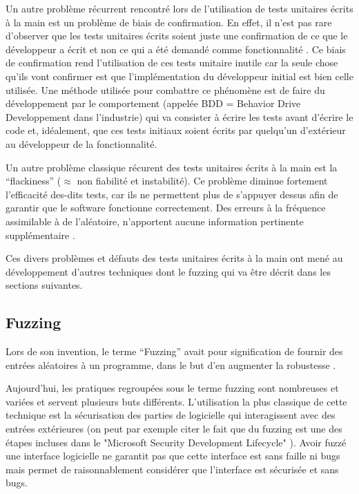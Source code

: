 \documentclass[a4paper]{report}
\begin{document}
Un autre problème récurrent rencontré lors de l'utilisation de tests unitaires écrits à la main est un problème de biais de confirmation.
En effet, il n'est pas rare d'observer que les tests unitaires écrits soient juste une confirmation de ce que le développeur a écrit et non ce qui a été demandé comme fonctionnalité \cite{Calikli2014}.
Ce biais de confirmation rend l'utilisation de ces tests unitaire inutile car la seule chose qu'ils vont confirmer est que l'implémentation du développeur initial est bien celle utilisée.
Une méthode utilisée pour combattre ce phénomène est de faire du développement par le comportement (appelée BDD = Behavior Drive Developpement dans l'industrie) qui va consister à écrire les tests avant d'écrire le code et, idéalement, que ces tests initiaux soient écrits par quelqu'un d'extérieur au développeur de la fonctionnalité.

Un autre problème classique récurent des tests unitaires écrits à la main est la “flackiness” ($\approx$ non fiabilité et instabilité).
Ce problème diminue fortement l'efficacité des-dits tests, car ils ne permettent plus de s'appuyer dessus afin de garantir que le software fonctionne correctement.
Des erreurs à la fréquence assimilable à de l'aléatoire, n'apportent aucune information pertinente supplémentaire \cite{Luo2014}.


Ces divers problèmes et défauts des tests unitaires écrits à la main ont mené au développement d’autres techniques dont le fuzzing qui va être décrit dans les sections suivantes.

\subsection{Fuzzing}

Lors de son invention, le terme “Fuzzing” avait pour signification de fournir des entrées aléatoires à un programme, dans le but d'en augmenter la robustesse \cite{Forrester2000}.

Aujourd’hui, les pratiques regroupées sous le terme fuzzing sont nombreuses et variées et servent plusieurs buts différents.
L'utilisation la plus classique  de cette technique est la sécurisation des parties de logicielle qui interagissent avec des entrées extérieures \cite{Godefroid2020} (on peut par exemple citer le fait que du fuzzing est une des étapes incluses dans le "Microsoft Security Development Lifecycle" \cite{howard2006security} ).
Avoir fuzzé une interface logicielle ne garantit pas que cette interface est sans faille ni bugs mais permet de raisonnablement considérer que l'interface est sécurisée et sans bugs\cite{Godefroid2020}.
\end{document}
